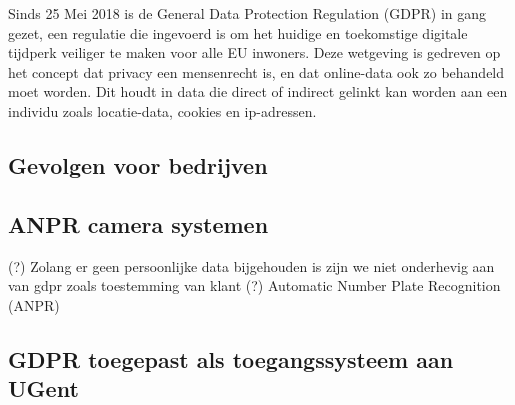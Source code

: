 Sinds 25 Mei 2018 is de General Data Protection Regulation (GDPR) in gang gezet, een regulatie die ingevoerd is om het huidige  en toekomstige digitale tijdperk veiliger te maken voor alle EU inwoners. 
Deze wetgeving is gedreven op het concept dat privacy een mensenrecht is, en dat online-data ook zo behandeld moet worden. Dit houdt in data die direct of indirect gelinkt kan worden aan een individu zoals locatie-data, cookies en ip-adressen.\autocite{goddard2017eu}

\subsection{Gevolgen voor bedrijven}



\subsection{ANPR camera systemen}
\label{anpr-cameras}

(?) Zolang er geen persoonlijke data bijgehouden is zijn we niet onderhevig aan van gdpr zoals toestemming van klant (?)
Automatic Number Plate Recognition (ANPR)

\subsection{GDPR toegepast als toegangssysteem aan UGent}
